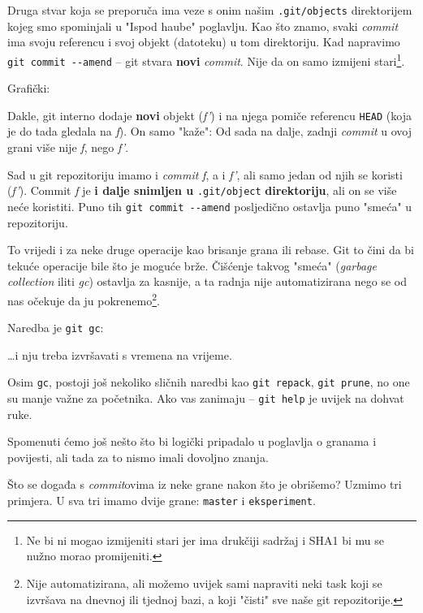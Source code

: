 
Druga stvar koja se preporuča ima veze s onim našim \verb+.git/objects+ direktorijem kojeg smo spominjali u "Ispod haube" poglavlju.
Kao što znamo, svaki \emph{commit} ima svoju referencu i svoj objekt (datoteku) u tom direktoriju.
Kad napravimo \verb+git commit --amend+ -- git stvara \textbf{novi} \emph{commit}.
Nije da on samo izmijeni stari\footnote{Ne bi ni mogao izmijeniti stari jer ima drukčiji sadržaj i SHA1 bi mu se nužno morao promijeniti.}.

Grafički:



Dakle, git interno dodaje \textbf{novi} objekt (\emph{f'}) i na njega pomiče referencu \verb+HEAD+ (koja je do tada gledala na \emph f).
On samo "kaže": Od sada na dalje, zadnji \emph{commit} u ovoj grani više nije \emph f, nego \emph{f'}.

Sad u git repozitoriju imamo i \emph{commit} \emph f, a i \emph{f'}, ali samo jedan od njih se koristi (\emph{f'}).
Commit \emph f je \textbf{i dalje snimljen u} \verb+.git/object+ \textbf{direktoriju}, ali on se više neće koristiti.
Puno tih \verb+git commit --amend+ posljedično ostavlja puno "smeća" u repozitoriju.

To vrijedi i za neke druge operacije kao brisanje grana ili rebase.
Git to čini da bi tekuće operacije bile što je moguće brže.
Čišćenje takvog "smeća" (\emph{garbage collection} iliti \emph{gc}) ostavlja za kasnije, a ta radnja nije automatizirana nego se od nas očekuje da ju pokrenemo\footnote{Nije automatizirana, ali možemo uvijek sami napraviti neki task koji se izvršava na dnevnoj ili tjednoj bazi, a koji "čisti" sve naše git repozitorije.}.

Naredba je \verb+git gc+:



\dots{}i nju treba izvršavati s vremena na vrijeme.

Osim \verb+gc+, postoji još nekoliko sličnih naredbi kao \verb+git repack+, \verb+git prune+, no one su manje važne za početnika.
Ako vas zanimaju -- \verb+git help+ je uvijek na dohvat ruke.


Spomenuti ćemo još nešto što bi logički pripadalo u poglavlja o granama i povijesti, ali tada za to nismo imali dovoljno znanja.

Što se događa s \emph{commit}ovima iz neke grane nakon što je obrišemo?
Uzmimo tri primjera.
U sva tri imamo dvije grane: \verb+master+ i \verb+eksperiment+.

